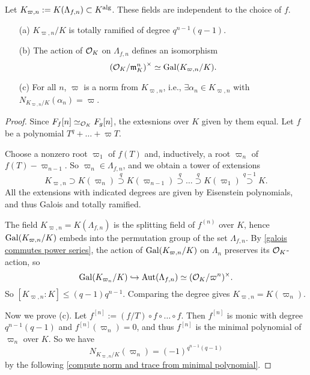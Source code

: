 \begin{theorem}\label{construction of K_{varpi, n}}
    Let $K_{\varpi, n} := K(\Lambda_{f, n})\subset K^{\mathrm{alg}}$.
    These fields are independent to the choice of $f$.\begin{enumerate}
        \item [(a)] $K_{\varpi, n}/K$ is totally ramified of degree $q^{n-1}(q-1)$.
        \item [(b)] The action of $\mathcal{O}_K$ on $\Lambda_{f, n}$ defines an isomorphism \begin{equation}
            \left( \mathcal{O}_K/\mathfrak{m}_K^n \right)^\times \simeq \operatorname{Gal}(K_{\varpi, n}/K).
        \end{equation}
        \item [(c)] For all $n$, $\varpi$ is a norm from $K_{\varpi, n}$, i.e., $\exists\alpha_n\in K_{\varpi, n}$ with $N_{K_{\varpi, n}/K}(\alpha_n) = \varpi$.
    \end{enumerate}
\end{theorem}
\begin{proof}
    Since $F_f[n]\simeq_{\mathcal{O}_K} F_g[n]$, the extesnions over $K$ given by them equal.
    Let $f$ be a polynomial $T^q + \dots + \varpi T$.

    Choose a nonzero root $\varpi_1$ of $f(T)$ and, inductively, a root $\varpi_n$ of $f(T) - \varpi_{n-1}$.
    So $\varpi_n\in\Lambda_{f, n}$, and we obtain a tower of extensions \[K_{\varpi, n}\supset K(\varpi_n)\stackrel{q}{\supset} K(\varpi_{n-1}) \stackrel{q}{\supset}\dots\stackrel{q}{\supset} K(\varpi_1)\stackrel{q-1}{\supset} K.\]
    All the extensions with indicated degrees are given by Eisenstein polynomials, and thus Galois and totally ramified.

    The field $K_{\varpi, n} = K(\Lambda_{f, n})$ is the splitting field of $f^{(n)}$ over $K$, hence $\operatorname{Gal}(K_{\varpi, n}/K)$ embeds into the permutation group of the set $\Lambda_{f, n}$. By \cref{galois commutes power series}, the action of $\operatorname{Gal}(K_{\varpi, n}/K)$ on $\Lambda_n$ preserves its $\mathcal{O}_K$-action, so
    \[\operatorname{Gal}(K_{\varpi_n}/K)\hookrightarrow \operatorname{Aut}(\Lambda_{f, n})\simeq (\mathcal{O}_K/\varpi^n)^\times.\]
    So $[K_{\varpi, n} : K]\le (q - 1)q^{n-1}$. Comparing the degree gives $K_{\varpi, n} = K(\varpi_n) $.

    Now we prove (c).
    Let $f^{[n]} := (f/T)\circ f\circ\dots\circ f$. Then $f^{[n]}$ is monic with degree $q^{n-1}(q-1)$ and $f^{[n]}(\varpi_n) = 0$, and thus $f^{[n]}$ is the minimal polynomial of $\varpi_n$ over $K$. So we have \[N_{K_{\varpi, n}/K}(\varpi_n) = (-1)^{q^{n-1}(q-1)}\]
    by the following \cref{compute norm and trace from minimal polynomial}.
\end{proof}

